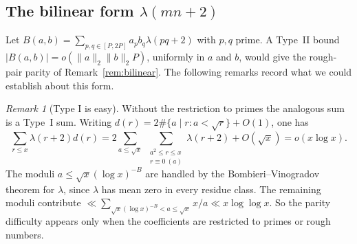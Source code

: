 \documentclass[11pt]{amsart}
\theoremstyle{definition}
\theoremstyle{remark}
\newtheorem{remark}[theorem]{Remark}
\begin{document}
\subsection{The bilinear form $\lambda(mn+2)$}\label{sec:bilinear}
Let $B(a,b)=\sum_{p,q\in[P,2P]}a_pb_q\lambda(pq+2)$ with $p,q$ prime. A Type~II bound $|B(a,b)|=o(\|a\|_2\|b\|_2P)$, uniformly in $a$ and $b$, would give the rough-pair parity of Remark~\ref{rem:bilinear}. The following remarks record what we could establish about this form.

\begin{remark}[Type I is easy]\label{rem:typeI}
Without the restriction to primes the analogous sum is a Type~I sum. Writing $d(r)=2\#\{a\mid r:a<\sqrt r\}+O(1)$, one has
\[
\sum_{r\le x}\lambda(r+2)d(r)=2\sum_{a\le\sqrt x}\ \sum_{\substack{a^2\le r\le x\\ r\equiv0\ (a)}}\lambda(r+2)+O(\sqrt x)=o(x\log x).
\]
The moduli $a\le\sqrt x(\log x)^{-B}$ are handled by the Bombieri--Vinogradov theorem for $\lambda$, since $\lambda$ has mean zero in every residue class. The remaining moduli contribute $\ll\sum_{\sqrt x(\log x)^{-B}<a\le\sqrt x}x/a\ll x\log\log x$. So the parity difficulty appears only when the coefficients are restricted to primes or rough numbers.
\end{remark}
\end{document}
